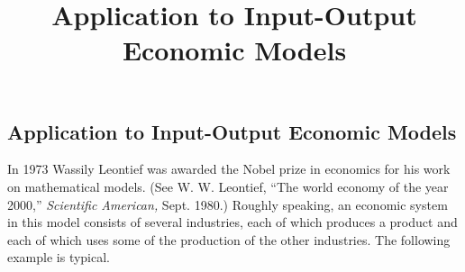 \documentclass{ximera}
\title{Application to Input-Output Economic Models} \license{CC BY-NC-SA 4.0}
\begin{document}
\begin{abstract}
\end{abstract}
\maketitle

\begin{onlineOnly}
\section*{Application to Input-Output Economic Models}
\end{onlineOnly}

In 1973 Wassily Leontief was awarded the Nobel prize in economics for his work on mathematical models.  (See W. W. Leontief, ``The world economy of the year 2000,'' \textit{Scientific American,} Sept. 1980.) Roughly speaking, an economic system in this model consists of several industries, each of which produces a product and each of which uses some of the production of the other industries. The following example is typical.
\end{document}
